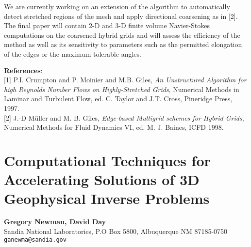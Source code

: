 \documentclass[11pt]{article}
\newcommand{\nextab}[4]{
	\section{#2}
	{\bf #1} \\ \nopagebreak
	{#3} \\ \nopagebreak
	{\tt #4} \nopagebreak
	}
\begin{document}
We are currently working on an extension of the algorithm to
automatically detect stretched regions of the mesh and apply
directional coarsening as in [2]. The final paper will contain 2-D and
3-D finite volume Navier-Stokes computations on the coarsened hybrid
grids and will assess the efficiency of the method as well as its
sensitivity to parameters such as the permitted elongation of the
edges or the maximum tolerable angles.

{\bf References}:
\\{}
[1] P.I. Crumpton and P. Moinier and M.B. Giles,
     {\em An Unstructured Algorithm for high {R}eynolds Number
      Flows on Highly-Stretched Grids},
      Numerical Methods in Laminar and Turbulent Flow,
      ed. C. Taylor and J.T. Cross, Pineridge Press, 1997.
\\{}
[2] J.-D M\"uller and M. B. Giles, {\em Edge-based Multigrid schemes for
     Hybrid Grids}, Numerical Methods for Fluid Dynamics VI,
     ed. M. J. Baines, ICFD 1998.




\nextab{Gregory Newman, David Day}
	{Computational Techniques for Accelerating Solutions of 3D
		Geophysical Inverse Problems}
	{Sandia National Laboratories, P.O Box 5800, Albuquerque NM 87185-0750}
	{ganewma@sandia.gov}
\end{document}

